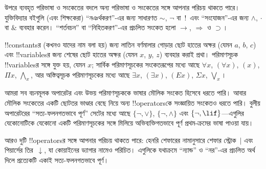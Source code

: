 \documentclass[../../../include/open-logic-section]{subfiles}
\begin{document}

\begin{intro}
উপরে ব্যবহৃত পরিভাষা ও সংকেতের বদলে অন্য পরিভাষা ও সংকেতের সঙ্গে আপনার
পরিচয় থাকতে পারে। যুক্তিবিদ্যার বইগুলি (এবং শিক্ষকেরা) “নঞর্থকরণ”-এর
জন্য সাধারণত $\sim$, $\neg$ বা~!\ এবং “সংযোজন”-এর জন্য $\wedge$,
$\cdot$ বা $\&$ ব্যবহার করেন। “শর্তবচন” বা “নিহিতকরণ”-এর প্রচলিত
সংকেত হলো $\rightarrow$, $\Rightarrow$ ও $\supset$।

!!{constant}sর (কখনও যাদের নাম বলা হয়) জন্য লাতিন বর্ণমালার গোড়ার
ছোট হাতের অক্ষর (যেমন $a$, $b$, $c$) এবং !!{variable}sর জন্য শেষের
ছোট হাতের অক্ষর (যেমন $x$, $y$, $z$) ব্যবহার করাই প্রথা। পরিমাণসূচক
!!{variable}sর সঙ্গে যুক্ত হয়, যেমন $x$; সার্বিক পরিমাণসূচকের
সংকেতরূপের মধ্যে আছে $\forall x$, $(\forall x)$, $(x)$, $\Pi x$,
$\bigwedge_x$, আর অস্তিত্বসূচক পরিমাণসূচকের মধ্যে আছে $\exists x$,
$(\exists x)$, $(Ex)$, $\Sigma x$, $\bigvee_x$।
\end{intro}

\begin{explain}
আমরা সব বচনমূলক অপারেটর এবং উভয় পরিমাণসূচককে ভাষার মৌলিক সংকেত
হিসেবে ধরতে পারি। আবার মৌলিক সংকেতের একটি ছোটতর ভাণ্ডার বেছে নিয়ে
অন্য !!{operator}sকে সংজ্ঞায়িত সংকেতও ধরতে পারি। বুলীয় অপারেটরের
“সত্য-ফলনগতভাবে পূর্ণ” সেটের মধ্যে আছে $\{ \lnot, \lor \}$,
$\{ \lnot, \land \}$ এবং $\{ \lnot, \lif\}$—এগুলির যেকোনোটিকে
যেকোনো একটি পরিমাণসূচকের সঙ্গে মিলিয়ে অভিব্যক্তিগতভাবে পূর্ণ
প্রথম-ক্রমের ভাষা পাওয়া যায়।

আরও দুটি !!{operator}sর সঙ্গে আপনার পরিচয় থাকতে পারে: হেনরি শেফারের
নামানুসারে শেফার স্ট্রোক~$|$ এবং পিয়ার্সের তির~$\downarrow$, যা
কোয়াইনের ড্যাগার নামেও পরিচিত। এগুলিকে যথাক্রমে “ন্যান্ড” ও “নর”-এর
প্রচলিত অর্থ দিলে প্রত্যেকটি একাই সত্য-ফলনগতভাবে পূর্ণ।
\end{explain}
\end{document}
